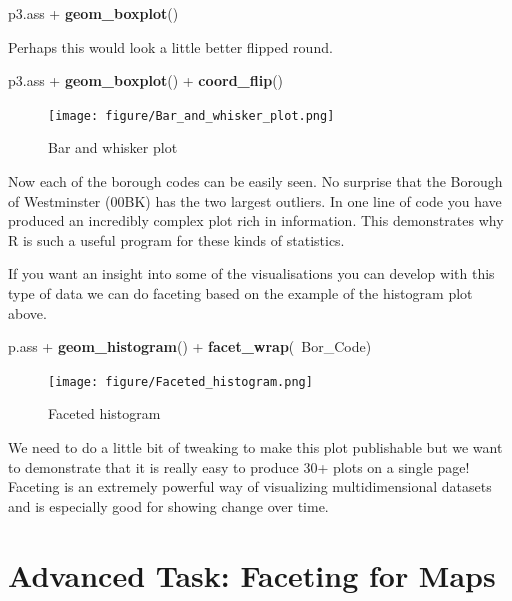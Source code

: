 \documentclass[]{article}
\newenvironment{Shaded}{}{}
\newcommand{\KeywordTok}[1]{\textcolor[rgb]{0.00,0.44,0.13}{\textbf{{#1}}}}
\newcommand{\NormalTok}[1]{{#1}}
\begin{document}
\begin{Shaded}
\begin{Highlighting}[]
\NormalTok{p3.ass + }\KeywordTok{geom_boxplot}\NormalTok{()}
\end{Highlighting}
\end{Shaded}
Perhaps this would look a little better flipped round.

\begin{Shaded}
\begin{Highlighting}[]
\NormalTok{p3.ass + }\KeywordTok{geom_boxplot}\NormalTok{() + }\KeywordTok{coord_flip}\NormalTok{()}
\end{Highlighting}
\end{Shaded}
\begin{figure}[htbp]
\centering
\texttt{[image: figure/Bar\_and\_whisker\_plot.png]}
\caption{Bar and whisker plot}
\end{figure}

Now each of the borough codes can be easily seen. No surprise that the
Borough of Westminster (00BK) has the two largest outliers. In one line
of code you have produced an incredibly complex plot rich in
information. This demonstrates why R is such a useful program for these
kinds of statistics.

If you want an insight into some of the visualisations you can develop
with this type of data we can do faceting based on the example of the
histogram plot above.

\begin{Shaded}
\begin{Highlighting}[]
\NormalTok{p.ass + }\KeywordTok{geom_histogram}\NormalTok{() + }\KeywordTok{facet_wrap}\NormalTok{(~Bor_Code)}
\end{Highlighting}
\end{Shaded}
\begin{figure}[htbp]
\centering
\texttt{[image: figure/Faceted\_histogram.png]}
\caption{Faceted histogram}
\end{figure}

We need to do a little bit of tweaking to make this plot publishable but
we want to demonstrate that it is really easy to produce 30+ plots on a
single page! Faceting is an extremely powerful way of visualizing
multidimensional datasets and is especially good for showing change over
time.

\section{Advanced Task: Faceting for Maps}
\end{document}
